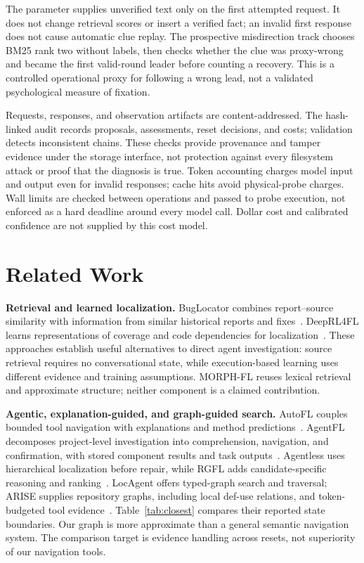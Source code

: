 \documentclass[letterpaper,journal]{IEEEtran}
\newcommand{\tool}{MORPH-FL}
\newcommand{\code}[1]{\texttt{\detokenize{#1}}}
\begin{document}
The \code{initial_clue} parameter supplies unverified text only on the first attempted request. It does not change retrieval scores or insert a verified fact; an invalid first response does not cause automatic clue replay. The prospective misdirection track chooses BM25 rank two without labels, then checks whether the clue was proxy-wrong and became the first valid-round leader before counting a recovery. This is a controlled operational proxy for following a wrong lead, not a validated psychological measure of fixation.

Requests, responses, and observation artifacts are content-addressed. The hash-linked audit records proposals, assessments, reset decisions, and costs; validation detects inconsistent chains. These checks provide provenance and tamper evidence under the storage interface, not protection against every filesystem attack or proof that the diagnosis is true. Token accounting charges model input and output even for invalid responses; cache hits avoid physical-probe charges. Wall limits are checked between operations and passed to probe execution, not enforced as a hard deadline around every model call. Dollar cost and calibrated confidence are not supplied by this cost model.

\section{Related Work}\label{sec:related}
\textbf{Retrieval and learned localization.} BugLocator combines report--source similarity with information from similar historical reports and fixes~\cite{buglocator2012}. DeepRL4FL learns representations of coverage and code dependencies for localization~\cite{deeprl4fl2021}. These approaches establish useful alternatives to direct agent investigation: source retrieval requires no conversational state, while execution-based learning uses different evidence and training assumptions. \tool{} reuses lexical retrieval and approximate structure; neither component is a claimed contribution.

\textbf{Agentic, explanation-guided, and graph-guided search.} AutoFL couples bounded tool navigation with explanations and method predictions~\cite{autofl2024}. AgentFL decomposes project-level investigation into comprehension, navigation, and confirmation, with stored component results and task outputs~\cite{agentfl2024}. Agentless uses hierarchical localization before repair, while RGFL adds candidate-specific reasoning and ranking~\cite{agentless2025,rgfl2026}. LocAgent offers typed-graph search and traversal; ARISE supplies repository graphs, including local def-use relations, and token-budgeted tool evidence~\cite{locagent2025,arise2026}. Table~\ref{tab:closest} compares their reported state boundaries. Our graph is more approximate than a general semantic navigation system. The comparison target is evidence handling across resets, not superiority of our navigation tools.
\end{document}
